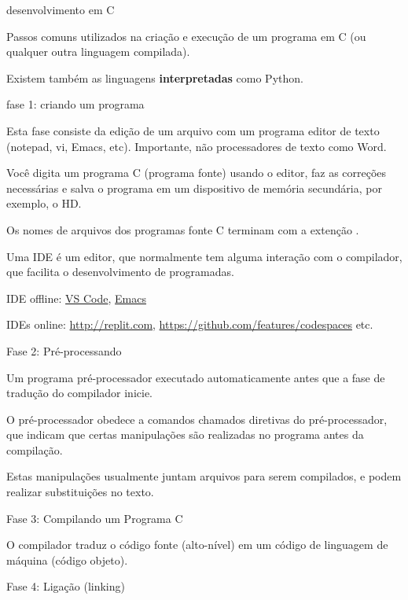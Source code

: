 \documentclass{beamer}
\begin{document}
\begin{frame}[allowframebreaks]{desenvolvimento em C}

  Passos comuns utilizados na criação e execução de um programa em C
  (ou qualquer outra linguagem compilada).

  Existem também as linguagens \textbf{interpretadas} como Python.

  \framebreak

  fase 1: criando um programa
  
  Esta fase consiste da edição de um arquivo com um programa editor de
  texto (notepad, vi, Emacs, etc). Importante, não processadores de
  texto como Word.

  Você digita um programa C (programa fonte) usando o editor, faz as
  correções necessárias e salva o programa em um dispositivo de
  memória secundária, por exemplo, o HD.
  
  Os nomes de arquivos dos programas fonte C terminam com a extenção
  .

  \framebreak

  Uma IDE é um editor, que normalmente tem alguma interação com o
  compilador, que facilita o desenvolvimento de programadas.

  IDE offline: \href{https://code.visualstudio.com}{VS Code},
  \href{https://www.gnu.org/software/emacs/}{Emacs}

  IDEs online: \url{http://replit.com},
  \url{https://github.com/features/codespaces} etc.
  
  \framebreak

  Fase 2: Pré-processando 
  
  Um programa pré-processador executado automaticamente antes que a
  fase de tradução do compilador inicie.
  
  O pré-processador obedece a comandos chamados diretivas do
  pré-processador, que indicam que certas manipulações são realizadas
  no programa antes da compilação.
  
  Estas manipulações usualmente juntam arquivos para serem compilados,
  e podem realizar substituições no texto.

  \framebreak

  Fase 3: Compilando um Programa C
  
  O compilador traduz o código fonte (alto-nível) em um código de
  linguagem de máquina (código objeto).

  \framebreak

  Fase 4: Ligação (linking)
  

\end{frame}
\end{document}
